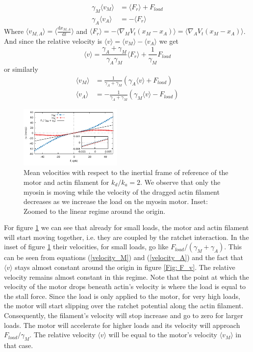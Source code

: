 \documentclass[aps,pre,twocolumn,showpacs,showkeys,a4paper]{revtex4}
\newcommand{\rmd}{{\mathrm d}}
\begin{document}
\begin{align*}
\gamma_M \langle v_M \rangle &= \langle F_r \rangle + F_{load} \\
\gamma_A \langle v_A \rangle &= -\langle F_r \rangle
\end{align*}
Where $\langle v_{M,A} \rangle = \langle \frac{\rmd x_{M,A}}{\rmd t} \rangle$ 
and $\langle F_r \rangle = - \langle \nabla_M V_t(x_M - x_A ) \rangle = \langle \nabla_A V_t(x_M - x_A ) \rangle $. 
And since the relative velocity is $\langle v \rangle = \langle v_{M} \rangle - \langle v_{A} \rangle$ we get
\begin{equation*}
\langle v \rangle = \frac{\gamma_A + \gamma_M}{\gamma_A \gamma_M} \langle F_r \rangle + \frac{1}{\gamma_M} F_{load}
\end{equation*}
or similarly
\begin{align}
\langle v_M \rangle &= \frac{1}{ \gamma_A + \gamma_M } \left( \gamma_A \langle v \rangle + F_{load} \right) \label{velocity_M} \\
\langle v_A \rangle &= -\frac{1}{ \gamma_A + \gamma_M } \left( \gamma_M \langle v \rangle - F_{load} \right)
\label{velocity_A}
\end{align}

\begin{figure}[t]
\centering
\includegraphics[width=0.45\textwidth,height=!]{individual_velocities}
\caption{Mean velocities with respect to the inertial frame of reference of the motor and actin filament for $k_d/k_a = 2$.
We observe that only the myosin is moving while the velocity of the dragged actin filament decreases as we increase the load on the myosin motor.
Inset: Zoomed to the linear regime around the origin.
}
\label{Fig: ind_v} 
\end{figure}
For figure \ref{Fig: ind_v} we can see that already for small loads, the motor and actin filament will start moving together, i.e. they are coupled by the ratchet interaction. 
In the inset of figure \ref{Fig: ind_v} their velocities, for small loads, go like $F_{load}/(\gamma_M + \gamma_A)$. 
This can be seen from equations (\ref{velocity_M}) and (\ref{velocity_A}) and the fact that $\langle v \rangle$ stays almost constant around the origin in figure \ref{Fig: F_v}. 
The relative velocity remains almost constant in this regime.
Note that the point at which the velocity of the motor drops beneath actin's velocity is where the load is equal to the stall force.
Since the load is only applied to the motor, for very high loads, the motor will start slipping over the ratchet potential along the actin filament. 
Consequently, the filament's velocity will stop increase and go to zero for larger loads. 
The motor will accelerate for higher loads and its velocity will approach $F_{load}/\gamma_M$. 
The relative velocity $\langle v \rangle$ will be equal to the motor's velocity $\langle v_M \rangle$ in that case.
\end{document}
